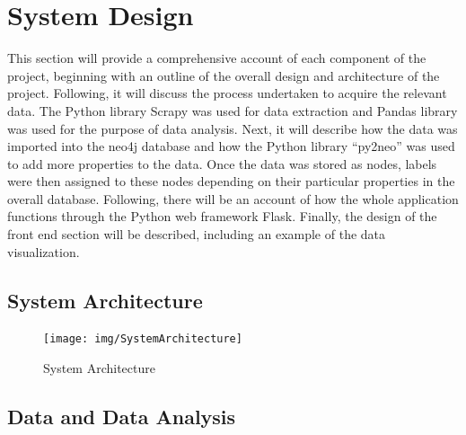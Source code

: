 \chapter{System Design}
This section will provide a comprehensive account of each component of the project, beginning with an outline of the overall design and architecture of the project. Following, it will discuss the process undertaken to acquire the relevant data. The Python library Scrapy was used for data extraction and Pandas library was used for the purpose of data analysis. Next, it will describe how the data was imported into the neo4j database and how the Python library “py2neo” was used to add more properties to the data. Once the data was stored as nodes, labels were then assigned to these nodes depending on their particular properties in the overall database. Following, there will be an account of how the whole application functions through the Python web framework Flask. Finally, the design of the front end section will be described, including an example of the data visualization.
\section{System Architecture}
	\begin{figure}[h]
		\caption{System Architecture}
		\centering
		\texttt{[image: img/SystemArchitecture]}
	\end{figure}
\pagebreak
\section{Data and Data Analysis}
